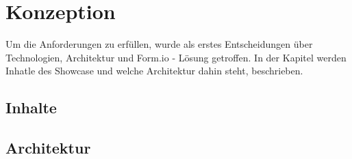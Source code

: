 \chapter{Konzeption}
Um die Anforderungen zu erfüllen, wurde als erstes Entscheidungen über Technologien, Architektur und Form.io - Lösung getroffen. In der Kapitel werden Inhatle des Showcase und welche Architektur dahin steht, beschrieben.

\section{Inhalte}
\section{Architektur}

